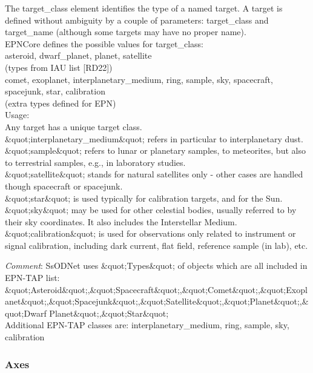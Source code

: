 \documentclass[11pt,a4paper]{ivoa}
\begin{document}
The target\_class element identifies the type of a named target. A target is defined without ambiguity by a couple of parameters: target\_class and target\_name (although some targets may have no proper name). \\ EPNCore defines the possible values for target\_class: \\ asteroid, dwarf\_planet, planet, satellite\\ (types from IAU list [RD22])\\ comet, exoplanet, interplanetary\_medium, ring, sample, sky, spacecraft, spacejunk, star, calibration \\ (extra types defined for EPN) \\ Usage:\\ Any target has a unique target class.\\ \&quot;interplanetary\_medium\&quot; refers in particular to interplanetary dust.\\ \&quot;sample\&quot; refers to lunar or planetary samples, to meteorites, but also to terrestrial samples, e.g., in laboratory studies.\\ \&quot;satellite\&quot; stands for natural satellites only - other cases are handled though spacecraft or spacejunk.\\ \&quot;star\&quot; is used typically for calibration targets, and for the Sun.\\ \&quot;sky\&quot; may be used for other celestial bodies, usually referred to by their sky coordinates. It also includes the Interstellar Medium.\\\&quot;calibration\&quot; is used for observations only related to instrument or signal calibration, including dark current, flat field, reference sample (in lab), etc.

\emph{Comment}: SsODNet uses \&quot;Types\&quot; of objects which are all included in EPN-TAP list: \&quot;Asteroid\&quot;,\&quot;Spacecraft\&quot;,\&quot;Comet\&quot;,\&quot;Exoplanet\&quot;,\&quot;Spacejunk\&quot;,\&quot;Satellite\&quot;,\&quot;Planet\&quot;,\&quot;Dwarf Planet\&quot;,\&quot;Star\&quot;\\Additional EPN-TAP classes are: interplanetary\_medium, ring, sample, sky, calibration \\

\subsubsection{Axes \\}
\end{document}
